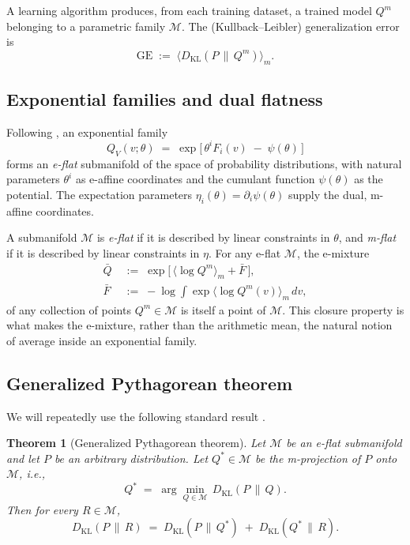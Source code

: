 \documentclass[11pt,a4paper]{article}
\newtheorem{theorem}{Theorem}
\theoremstyle{definition}
\theoremstyle{remark}
\newcommand{\KL}{D_{\mathrm{KL}}}
\newcommand{\PV}{P}
\newcommand{\QVm}{Q^{m}}
\newcommand{\QVbar}{\bar{Q}}
\newcommand{\Mfam}{\mathcal{M}}
\begin{document}
A learning algorithm produces, from each training dataset, a
trained model $\QVm$ belonging to a parametric family $\Mfam$.
The (Kullback--Leibler) generalization error is
\begin{equation}
  \mathrm{GE} \;:=\; \big\langle \KL(\PV \,\|\, \QVm) \big\rangle_{m}.
  \label{eq:GEdef}
\end{equation}

\subsection{Exponential families and dual flatness}

Following \cite{Amari2016}, an exponential family
\begin{equation}
  Q_{V}(v;\theta)
  \;=\;
  \exp\!\Big[\, \theta^{i} F_{i}(v) \;-\; \psi(\theta) \,\Big]
  \label{eq:expfam}
\end{equation}
forms an \emph{e-flat} submanifold of the space of probability
distributions, with natural parameters $\theta^{i}$ as e-affine
coordinates and the cumulant function $\psi(\theta)$ as the potential.
The expectation parameters
$\eta_{i}(\theta) = \partial_{i}\psi(\theta)$ supply the dual,
m-affine coordinates.

A submanifold $\Mfam$ is \emph{e-flat} if it is described by linear
constraints in $\theta$, and \emph{m-flat} if it is described by linear
constraints in $\eta$.
For any e-flat $\Mfam$, the e-mixture
\begin{align}
  \QVbar
  &\;:=\;
  \exp\!\Big[\,\big\langle \log \QVm \big\rangle_{m} + \bar F\,\Big],
  \nonumber \\
  \bar F
  &\;:=\; -\log\!\int\!\exp\!\big\langle \log \QVm(v)\big\rangle_{m}\,dv ,
  \label{eq:emixture}
\end{align}
of any collection of points $\QVm \in \Mfam$ is itself a point of
$\Mfam$. This closure property is what makes the e-mixture, rather
than the arithmetic mean, the natural notion of average inside an
exponential family.

\subsection{Generalized Pythagorean theorem}

We will repeatedly use the following standard result
\cite[Thm.~3.8]{Amari2016}.

\begin{theorem}[Generalized Pythagorean theorem]
\label{thm:GPT}
Let $\Mfam$ be an e-flat submanifold and let $P$ be an arbitrary
distribution. Let $Q^{*} \in \Mfam$ be the m-projection of $P$ onto
$\Mfam$, i.e.,
\begin{equation*}
  Q^{*} \;=\; \arg\min_{Q \in \Mfam}\, \KL(P \,\|\, Q).
\end{equation*}
Then for every $R \in \Mfam$,
\begin{equation}
  \KL(P \,\|\, R)
  \;=\;
  \KL(P \,\|\, Q^{*})
  \;+\;
  \KL(Q^{*} \,\|\, R) .
  \label{eq:GPT}
\end{equation}
\end{theorem}
\end{document}
